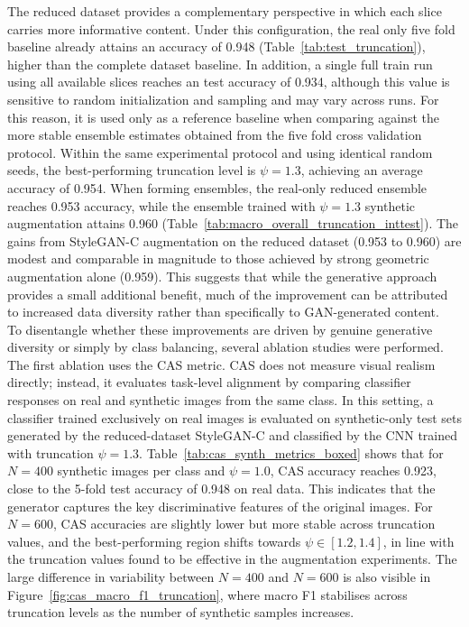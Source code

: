 The reduced dataset provides a complementary perspective in which each slice carries more informative content. Under this configuration, the real only five fold baseline already attains an accuracy of 0.948 (Table~\ref{tab:test_truncation}), higher than the complete dataset baseline. In addition, a single full train run using all available slices reaches an test accuracy of 0.934, although this value is sensitive to random initialization and sampling and may vary across runs. For this reason, it is used only as a reference baseline when comparing against the more stable ensemble estimates obtained from the five fold cross validation protocol.
Within the same experimental protocol and using identical random seeds, the best-performing truncation level is $\psi = 1.3$, achieving an average accuracy of 0.954. When forming ensembles, the real-only reduced ensemble reaches 0.953 accuracy, while the ensemble trained with $\psi = 1.3$ synthetic augmentation attains 0.960 (Table~\ref{tab:macro_overall_truncation_inttest}). The gains from StyleGAN-C augmentation on the reduced dataset (0.953 to 0.960) are modest and comparable in magnitude to those achieved by strong geometric augmentation alone (0.959). This suggests that while the generative approach provides a small additional benefit, much of the improvement can be attributed to increased data diversity rather than specifically to GAN-generated content.\\

To disentangle whether these improvements are driven by genuine generative diversity or simply by class balancing, several ablation studies were performed. The first ablation uses the CAS metric. CAS does not measure visual realism directly; instead, it evaluates task-level alignment by comparing classifier responses on real and synthetic images from the same class. In this setting, a classifier trained exclusively on real images is evaluated on synthetic-only test sets generated by the reduced-dataset StyleGAN-C and classified by the CNN trained with truncation $\psi = 1.3$. Table~\ref{tab:cas_synth_metrics_boxed} shows that for $N = 400$ synthetic images per class and $\psi = 1.0$, CAS accuracy reaches 0.923, close to the 5-fold test accuracy of 0.948 on real data. This indicates that the generator captures the key discriminative features of the original images. For $N = 600$, CAS accuracies are slightly lower but more stable across truncation values, and the best-performing region shifts towards $\psi \in [1.2, 1.4]$, in line with the truncation values found to be effective in the augmentation experiments. The large difference in variability between $N = 400$ and $N = 600$ is also visible in Figure~\ref{fig:cas_macro_f1_truncation}, where macro F1 stabilises across truncation levels as the number of synthetic samples increases.\\

